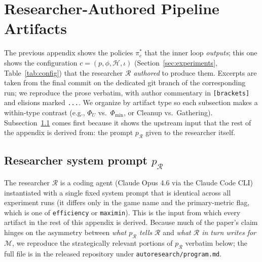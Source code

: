 \documentclass{article}
\newcommand{\cR}{\mathcal{R}}
\newcommand{\cM}{\mathcal{M}}
\begin{document}
\section{Researcher-Authored Pipeline Artifacts}
\label{app:artifacts}

The previous appendix shows the policies $\pi^*_c$ that the inner loop \emph{outputs}; this one shows the configuration $c = (p, \phi, \mathcal{H}, \iota)$ (Section~\ref{sec:experiments}, Table~\ref{tab:config}) that the researcher $\cR$ \emph{authored} to produce them. Excerpts are taken from the final commit on the dedicated git branch of the corresponding run; we reproduce the prose verbatim, with author commentary in \texttt{[brackets]} and elisions marked \texttt{...}. We organize by artifact type so each subsection makes a within-type contrast (e.g., $\Phi_U$ vs.\ $\Phi_{\min}$, or Cleanup vs.\ Gathering). Subsection~\ref{app:art-r-prompt} comes first because it shows the upstream input that the rest of the appendix is derived from: the prompt $p_\cR$ given to the researcher itself.

\subsection{Researcher system prompt $p_\cR$}
\label{app:art-r-prompt}

The researcher $\cR$ is a coding agent (Claude Opus 4.6 via the Claude Code CLI) instantiated with a single fixed system prompt that is identical across all experiment runs (it differs only in the game name and the primary-metric flag, which is one of \texttt{efficiency} or \texttt{maximin}). This is the input from which every artifact in the rest of this appendix is derived. Because much of the paper's claim hinges on the asymmetry between \emph{what $p_\cR$ tells $\cR$} and \emph{what $\cR$ in turn writes for $\cM$}, we reproduce the strategically relevant portions of $p_\cR$ verbatim below; the full file is in the released repository under \texttt{autoresearch/program.md}.
\end{document}
